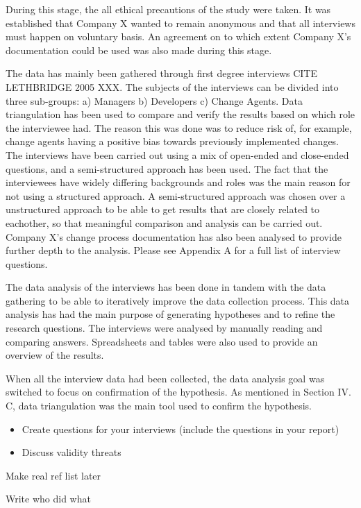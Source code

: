 \documentclass[times, 10pt,twocolumn]{IEEEtran}
\begin{document}
During this stage, the all ethical precautions of the study were taken. It was established that Company X wanted to remain anonymous and that all interviews must happen on voluntary basis. An agreement on to which extent Company X's documentation could be used was also made during this stage. 

The data has mainly been gathered through first degree interviews CITE LETHBRIDGE 2005 XXX. The subjects of the interviews can be divided into three sub-groups: a) Managers b) Developers c) Change Agents. Data triangulation has been used to compare and verify the results based on which role the interviewee had. The reason this was done was to reduce risk of, for example, change agents having a positive bias towards previously implemented changes. The interviews have been carried out using a mix of open-ended and close-ended questions, and a semi-structured approach has been used. The fact that the interviewees have widely differing backgrounds and roles was the main reason for not using a structured approach. A semi-structured approach was chosen over a unstructured approach to be able to get results that are closely related to eachother, so that meaningful comparison and analysis can be carried out. Company X's change process documentation has also been analysed to provide further depth to the analysis. Please see Appendix A for a full list of interview questions.

The data analysis of the interviews has been done in tandem with the data gathering to be able to iteratively improve the data collection process. This data analysis has had the main purpose of generating hypotheses and to refine the research questions. The interviews were analysed by manually reading and comparing answers. Spreadsheets and tables were also used to provide an overview of the results. 

When all the interview data had been collected, the data analysis goal was switched to focus on confirmation of the hypothesis. As mentioned in Section IV. C, data triangulation was the main tool used to confirm the hypothesis. 









\begin{itemize}
\item Create questions for your interviews (include the questions in your report)
\item Discuss validity threats
\end{itemize}

Make real ref list later


Write who did what
\end{document}
